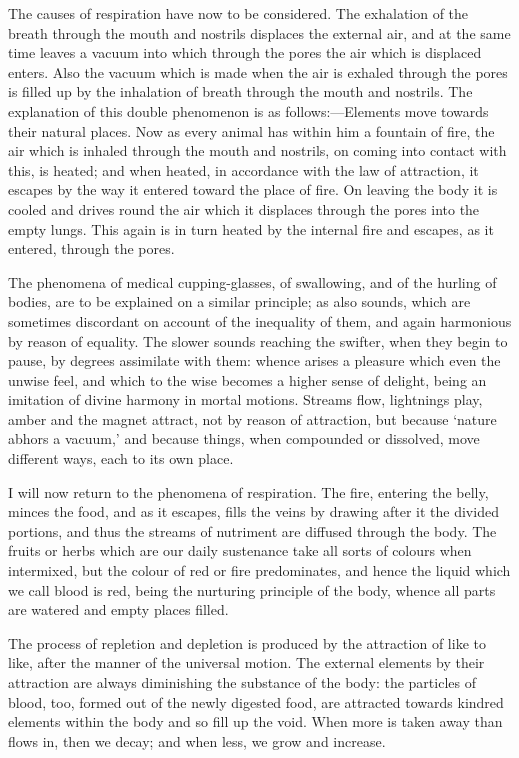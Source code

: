 \documentclass[11pt,letter]{article}
\begin{document}
\par  The causes of respiration have now to be considered. The exhalation of the breath through the mouth and nostrils displaces the external air, and at the same time leaves a vacuum into which through the pores the air which is displaced enters. Also the vacuum which is made when the air is exhaled through the pores is filled up by the inhalation of breath through the mouth and nostrils. The explanation of this double phenomenon is as follows:—Elements move towards their natural places. Now as every animal has within him a fountain of fire, the air which is inhaled through the mouth and nostrils, on coming into contact with this, is heated; and when heated, in accordance with the law of attraction, it escapes by the way it entered toward the place of fire. On leaving the body it is cooled and drives round the air which it displaces through the pores into the empty lungs. This again is in turn heated by the internal fire and escapes, as it entered, through the pores.

\par  The phenomena of medical cupping-glasses, of swallowing, and of the hurling of bodies, are to be explained on a similar principle; as also sounds, which are sometimes discordant on account of the inequality of them, and again harmonious by reason of equality. The slower sounds reaching the swifter, when they begin to pause, by degrees assimilate with them: whence arises a pleasure which even the unwise feel, and which to the wise becomes a higher sense of delight, being an imitation of divine harmony in mortal motions. Streams flow, lightnings play, amber and the magnet attract, not by reason of attraction, but because ‘nature abhors a vacuum,’ and because things, when compounded or dissolved, move different ways, each to its own place.

\par  I will now return to the phenomena of respiration. The fire, entering the belly, minces the food, and as it escapes, fills the veins by drawing after it the divided portions, and thus the streams of nutriment are diffused through the body. The fruits or herbs which are our daily sustenance take all sorts of colours when intermixed, but the colour of red or fire predominates, and hence the liquid which we call blood is red, being the nurturing principle of the body, whence all parts are watered and empty places filled.

\par  The process of repletion and depletion is produced by the attraction of like to like, after the manner of the universal motion. The external elements by their attraction are always diminishing the substance of the body: the particles of blood, too, formed out of the newly digested food, are attracted towards kindred elements within the body and so fill up the void. When more is taken away than flows in, then we decay; and when less, we grow and increase.
\end{document}
